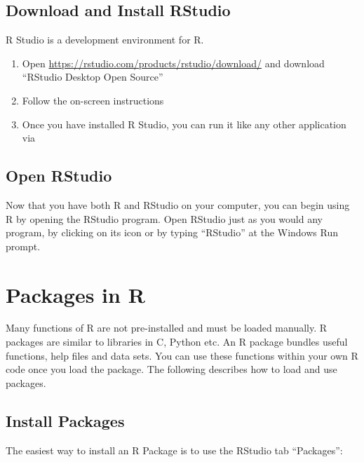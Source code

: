 \documentclass[
]{book}
\providecommand{\tightlist}{%
  \setlength{\itemsep}{0pt}\setlength{\parskip}{0pt}}
\begin{document}
\hypertarget{download-and-install-rstudio}{%
\section{Download and Install RStudio}\label{download-and-install-rstudio}}

R Studio is a development environment for R.

\begin{enumerate}
\def\labelenumi{\arabic{enumi}.}
\tightlist
\item
  Open \url{https://rstudio.com/products/rstudio/download/} and download ``RStudio Desktop Open Source''
\item
  Follow the on-screen instructions
\item
  Once you have installed R Studio, you can run it like any other application via
\end{enumerate}

\hypertarget{open-rstudio}{%
\section{Open RStudio}\label{open-rstudio}}

Now that you have both R and RStudio on your computer, you can begin using R by opening the RStudio program. Open RStudio just as you would any program, by clicking on its icon or by typing ``RStudio'' at the Windows Run prompt.

\hypertarget{packages}{%
\chapter{Packages in R}\label{packages}}

Many functions of R are not pre-installed and must be loaded manually. R packages are similar to libraries in C, Python etc. An R package bundles useful functions, help files and data sets. You can use these functions within your own R code once you load the package. The following describes how to load and use packages.

\hypertarget{install-packages}{%
\section{Install Packages}\label{install-packages}}

The easiest way to install an R Package is to use the RStudio tab ``Packages'':
\end{document}
